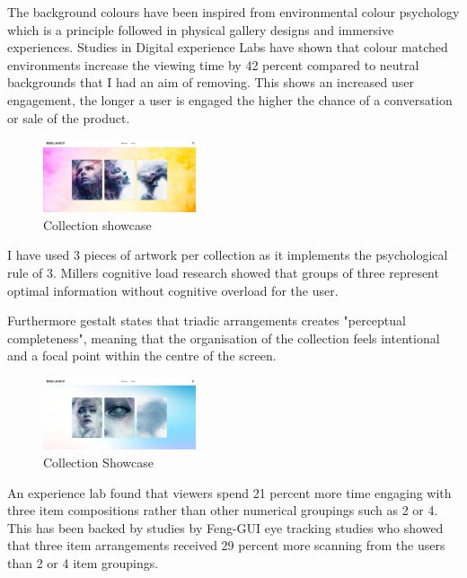 \documentclass[]{project_final}
\begin{document}
The background colours have been inspired from environmental colour psychology which is a principle followed in physical gallery designs and immersive experiences. Studies in Digital experience Labs have shown that colour matched environments increase the viewing time by 42 percent compared to neutral backgrounds that I had an aim of removing. This shows an increased user engagement, the longer a user is engaged the higher the chance of a conversation or sale of the product.

\begin{figure}[ht!]
  \centering
  \includegraphics[width=0.4\textwidth]{AG13.png}
  \vspace*{0.0cm}
  \caption{Collection showcase}
  \label{fig:1}
\end{figure}

I have used 3 pieces of artwork per collection as it implements the psychological rule of 3. Millers cognitive load research showed that groups of three represent optimal information without cognitive overload for the user.

Furthermore gestalt states that triadic arrangements creates "perceptual completeness", meaning that the organisation of the collection feels intentional and a focal point within the centre of the screen.

\begin{figure}[ht!]
  \centering
  \includegraphics[width=0.4\textwidth]{AG14.png}
  \vspace*{0.0cm}
  \caption{Collection Showcase}
  \label{fig:1}
\end{figure}

An experience lab found that viewers spend 21 percent more time engaging with three item compositions rather than other numerical groupings such as 2 or 4. This has been backed by studies by Feng-GUI eye tracking studies who showed that three item arrangements received 29 percent more scanning from the users than 2 or 4 item groupings.
\end{document}
